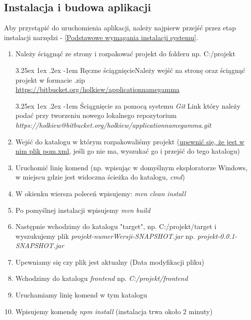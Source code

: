 \documentclass[10pt,titlepage]{article} %
\makeatletter
\renewcommand{\normalsize}{\fontsize{8pt}{10pt}\selectfont} %
\renewcommand\subparagraph{\@startsection{subparagraph}{6}{\parindent}%
  {3.25ex \@plus1ex \@minus .2ex}%
  {-1em}%
  {\normalfont\normalsize\bfseries}}
\makeatother
\begin{document}
\subsection{Instalacja i budowa aplikacji}\label{Instalacja i budowa aplikacji}
Aby przystąpić do uruchomienia aplikacji, należy najpierw przejść przez etap instalacji narzędzi - \ref{Podstawowe wymagania instalacji systemu}.
\begin{enumerate}[1.]
\item Należy ściągnąć ze strony i rozpakować projekt do folderu np. C:/projekt 

\subparagraph{Ręczne ściągnięcie}\mbox\\

Należy wejść na stronę oraz ściągnąć projekt w formacie .zip
\href{https://bitbucket.org/holkiew/applicationnamegamma}{https://bitbucket.org/holkiew/applicationnamegamma}

\subparagraph{Ściągnięcie za pomocą systemu \textit{Git}}
Link który należy podać przy tworzeniu nowego lokalnego repozytorium
\textit{https://holkiew@bitbucket.org/holkiew/applicationnamegamma.git}
\item Wejść do katalogu w którym rozpakowaliśmy projekt (\underline{upewnić się, że jest w nim plik pom.xml}, jeśli go nie ma, wyszukać go i przejść do tego katalogu)
\item Uruchomić linię komend (np. wpisując w domyślnym eksploratorze Windows, w miejscu gdzie jest widoczna ścieżka do katalogu, \textit{cmd})
\item W okienku wiersza poleceń wpisujemy: \textit{mvn clean install}
\item Po pomyślnej instalacji wpisujemy \textit{mvn build}
\item Następnie wchodzimy do katalogu "target", np. C:/projekt/target i wyszukujemy plik \textit{projekt-numerWersji-SNAPSHOT.jar} np. \textit{projekt-0.0.1-SNAPSHOT.jar}
\item Upewniamy się czy plik jest aktualny (Data modyfikacji pliku)
\item Wchodzimy do katalogu \textit{frontend} np. \textit{C:/projekt/frontend}
\item Uruchamiamy linię komend w tym katalogu
\item Wpisujemy komendę \textit{npm install} (instalacja trwa około 2 minuty)
\end{enumerate}

\end{document}
